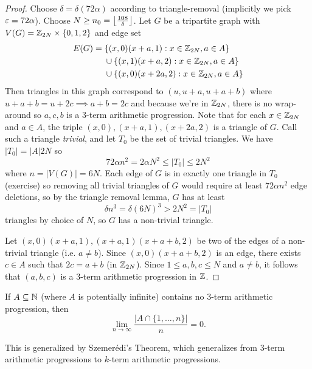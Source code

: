 \documentclass[main.tex]{subfiles}
\begin{document}
\begin{proof}
  Choose $\delta = \delta(72\alpha)$ according to triangle-removal (implicitly
  we pick $\varepsilon = 72\alpha$).
  Choose $N\geq n_0 = \left\lfloor \frac{108}{\delta} \right\rfloor$.
  Let $G$ be a tripartite graph with $V(G) = \mathbb Z_{2N}\times\{0,1,2\}$ and edge
  set
  \begin{align*}
    E(G) &= \{(x,0)(x+a,1) : x\in\bZ_{2N}, a\in A\} \\
         &\hphantom{{}={}}\cup\{(x,1)(x+a,2) : x\in\bZ_{2N},a\in A\} \\
         &\hphantom{{}={}}\cup\{(x,0)(x+2a,2): x\in\bZ_{2N}, a\in A\}
  \end{align*}
  Then triangles in this graph correspond to $(u,u+a,u+a+b)$ where
  $u+a+b = u + 2c\implies a + b = 2c$ and because we're in $\mathbb Z_{2N}$,
  there is no wrap-around so $a,c,b$ is a 3-term arithmetic progression.
  Note that for each $x\in\mathbb Z_{2N}$ and $a\in A$, the triple
  $(x,0),(x+a,1),(x+2a,2)$ is a triangle of $G$.
  Call such a triangle \textit{trivial}, and let $T_0$ be the set of trivial
  triangles.
  We have $|T_0| = |A|2N$ so
  \[
    72\alpha n^2 = 2\alpha N^2\leq|T_0|\leq 2N^2
  \]
  where $n = |V(G)| = 6N$.
  Each edge of $G$ is in exactly one triangle in $T_0$ (exercise) so removing
  all trivial triangles of $G$ would require at least $72\alpha n^2$ edge
  deletions, so by the triangle removal lemma, $G$ has at least
  \[
    \delta n^3 = \delta(6N)^3 > 2N^2 = |T_0|
  \]
  triangles by choice of $N$, so $G$ has a non-trivial triangle.

  Let $(x,0)(x+a,1), (x+a,1)(x+a+b,2)$ be two of the edges of a non-trivial
  triangle (i.e. $a\neq b$).
  Since $(x,0)(x+a+b,2)$ is an edge, there exists $c\in A$ such that $2c = a+b$
  (in $\mathbb Z_{2N}$).
  Since $1\leq a,b,c\leq N$ and $a\neq b$, it follows that $(a,b,c)$ is a
  3-term arithmetic progression in $\mathbb Z$.
\end{proof}
\begin{corollary}
  If $A\subseteq\mathbb N$ (where $A$ is potentially infinite) contains no 3-term
  arithmetic progression, then
  \[
    \lim_{n\to\infty}\frac{|A\cap\{1,\ldots,n\}|}{n} = 0.
  \]
\end{corollary}
This is generalized by Szemer\'edi's Theorem, which generalizes from 3-term
arithmetic progressions to $k$-term arithmetic progressions.
\end{document}
